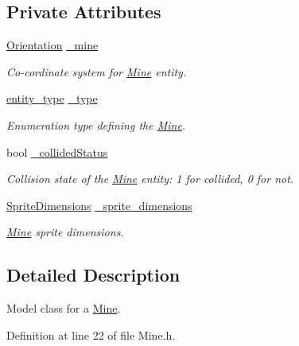 \subsection*{Private Attributes}
\begin{DoxyCompactItemize}
\item 
\hyperlink{classOrientation}{Orientation} \hyperlink{classMine_ada4e9674ae02b3d3035decc350222aa8}{\-\_\-mine}
\begin{DoxyCompactList}\small\item\em Co-\/cordinate system for \hyperlink{classMine}{Mine} entity. \end{DoxyCompactList}\item 
\hyperlink{Structures_8h_a6d8f83e710b27d4f86c45f0bb77066e3}{entity\-\_\-type} \hyperlink{classMine_a9f780de0af41828d0b03de8ecff36546}{\-\_\-type}
\begin{DoxyCompactList}\small\item\em Enumeration type defining the \hyperlink{classMine}{Mine}. \end{DoxyCompactList}\item 
bool \hyperlink{classMine_a1b68c443899530bad702085dcc52511a}{\-\_\-collided\-Status}
\begin{DoxyCompactList}\small\item\em Collision state of the \hyperlink{classMine}{Mine} entity\-: 1 for collided, 0 for not. \end{DoxyCompactList}\item 
\hyperlink{classSpriteDimensions}{Sprite\-Dimensions} \hyperlink{classMine_a82e6153c008e77eea41dfac4bc665db5}{\-\_\-sprite\-\_\-dimensions}
\begin{DoxyCompactList}\small\item\em \hyperlink{classMine}{Mine} sprite dimensions. \end{DoxyCompactList}\end{DoxyCompactItemize}


\subsection{Detailed Description}
Model class for a \hyperlink{classMine}{Mine}. 

Definition at line 22 of file Mine.\-h.



